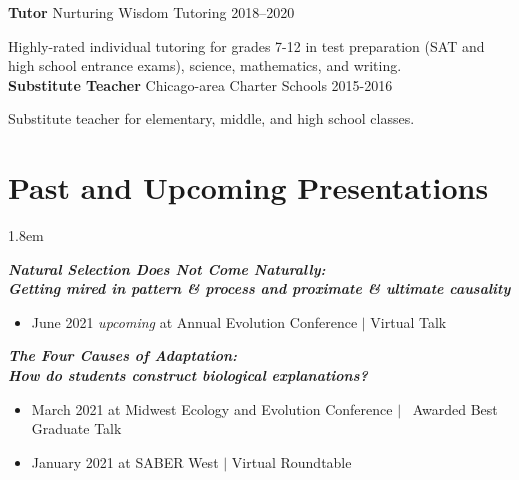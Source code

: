 \documentclass[]{article}
\begin{document}
\textbf{Tutor} Nurturing Wisdom Tutoring \hfill 2018--2020
     
Highly-rated individual tutoring for grades 7-12 in test preparation (SAT and high school entrance \linebreak exams), science, mathematics, and writing.\\

\textbf{Substitute Teacher} Chicago-area Charter Schools \hfill 2015-2016
     
Substitute teacher for elementary, middle, and high school classes.
\vspace{6mm}

\section{Past and Upcoming Presentations}

\vspace{2mm}
\leftskip 1.8em

\textit{\textbf{Natural Selection Does Not Come Naturally:\\Getting mired in pattern \& process and proximate \& ultimate causality}}

\begin{itemize}[label=$\mathwitch*$]
\item{June 2021 \textit{upcoming} at Annual Evolution Conference $\vert$ Virtual Talk 
\hspace{0.3mm} \href{https://ledelaney.org/talks/2021evolution}{\faImages} \href{https://github.com/ledelaney/06-21-Evolution}{\faGithub}}
\end{itemize}
\vspace{2mm}

\textit{\textbf{The Four Causes of Adaptation:\\How do students construct biological explanations?}}

\begin{itemize}[label=$\mathwitch*$]
\item{March 2021 at Midwest Ecology and Evolution Conference $\vert$ \faAward\ Awarded Best Graduate Talk \hspace{0.3mm} \href{https://ledelaney.org/talks/2021meec/}{\faImages} \href{https://github.com/ledelaney/03-21-MEEC}{\faGithub}}
\item{January 2021 at SABER West $\vert$ Virtual Roundtable \hspace{0.3mm} \href{https://ledelaney.org/talks/2021saberw/}{\faImages} \href{https://github.com/ledelaney/01-21-SABERwest}{\faGithub}}
\end{itemize}
\vspace{2mm}
\end{document}
